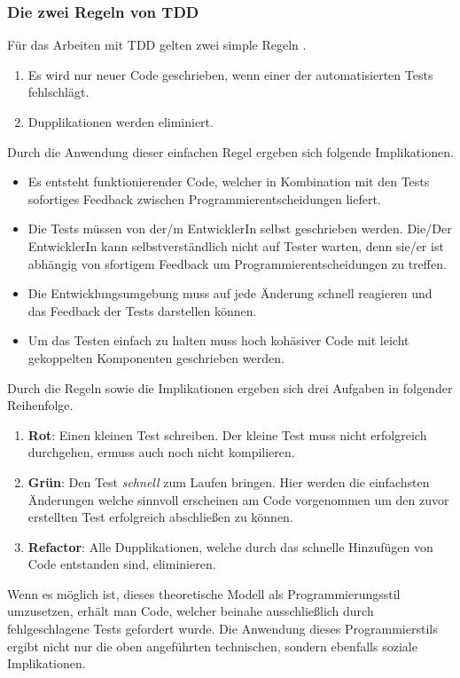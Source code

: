 \subsubsection{Die zwei Regeln von TDD}
Für das Arbeiten mit TDD gelten zwei simple Regeln \autocite[]{Beck:2003}.
\begin{enumerate}
  \item Es wird nur neuer Code geschrieben, wenn einer der automatisierten Tests fehlschlägt.
  \item Dupplikationen werden eliminiert.
\end{enumerate}
Durch die Anwendung dieser einfachen Regel ergeben sich folgende Implikationen.
\begin{itemize}
  \item Es entsteht funktionierender Code, welcher in Kombination mit den Tests sofortiges Feedback zwischen Programmierentscheidungen liefert.
  \item Die Tests müssen von der/m EntwicklerIn selbst geschrieben werden. Die/Der EntwicklerIn kann selbstverständlich nicht auf Tester warten, denn sie/er ist abhängig von sfortigem Feedback um Programmierentscheidungen zu treffen.
  \item Die Entwicklungsumgebung muss auf jede Änderung schnell reagieren und das Feedback der Tests darstellen können.
  \item Um das Testen einfach zu halten muss hoch kohäsiver Code mit leicht gekoppelten Komponenten geschrieben werden.
\end{itemize}
Durch die Regeln sowie die Implikationen ergeben sich drei Aufgaben in folgender Reihenfolge.
\begin{enumerate}
  \item \textbf{Rot}: Einen kleinen Test schreiben.\newline
  Der kleine Test muss nicht erfolgreich durchgehen, ermuss auch noch nicht kompilieren.
  \item \textbf{Grün}: Den Test \textit{schnell} zum Laufen bringen.\newline
  Hier werden die einfachsten Änderungen welche sinnvoll erscheinen am Code vorgenommen um den zuvor erstellten Test erfolgreich abschließen zu können.
  \item \textbf{Refactor}: Alle Dupplikationen, welche durch das schnelle Hinzufügen von Code entstanden sind, eliminieren.
\end{enumerate}
Wenn es möglich ist, dieses theoretische Modell als Programmierungsstil umzusetzen, erhält man Code, welcher beinahe ausschließlich durch fehlgeschlagene Tests gefordert wurde. Die Anwendung dieses Programmierstils ergibt nicht nur die oben angeführten technischen, sondern ebenfalls soziale Implikationen.
